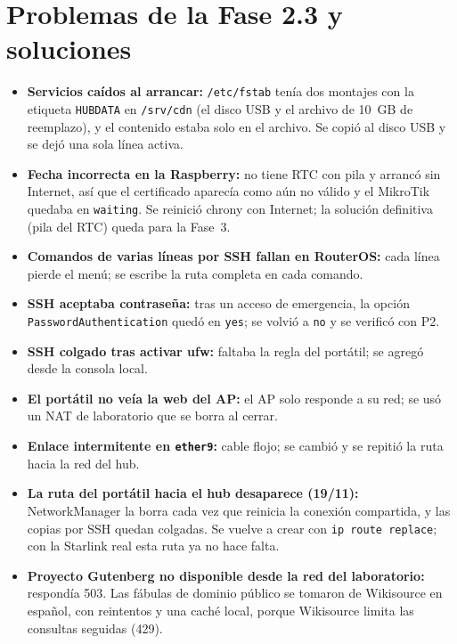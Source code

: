 \documentclass[conference]{IEEEtran}
\begin{document}
\section{Problemas de la Fase 2.3 y soluciones}
\begin{itemize}
\item \textbf{Servicios caídos al arrancar:} \texttt{/etc/fstab} tenía dos montajes con la etiqueta \texttt{HUBDATA} en \texttt{/srv/cdn} (el disco USB y el archivo de 10~GB de reemplazo), y el contenido estaba solo en el archivo. Se copió al disco USB y se dejó una sola línea activa.
\item \textbf{Fecha incorrecta en la Raspberry:} no tiene RTC con pila y arrancó sin Internet, así que el certificado aparecía como aún no válido y el MikroTik quedaba en \texttt{waiting}. Se reinició chrony con Internet; la solución definitiva (pila del RTC) queda para la Fase~3.
\item \textbf{Comandos de varias líneas por SSH fallan en RouterOS:} cada línea pierde el menú; se escribe la ruta completa en cada comando.
\item \textbf{SSH aceptaba contraseña:} tras un acceso de emergencia, la opción \texttt{PasswordAuthentication} quedó en \texttt{yes}; se volvió a \texttt{no} y se verificó con P2.
\item \textbf{SSH colgado tras activar ufw:} faltaba la regla del portátil; se agregó desde la consola local.
\item \textbf{El portátil no veía la web del AP:} el AP solo responde a su red; se usó un NAT de laboratorio que se borra al cerrar.
\item \textbf{Enlace intermitente en \texttt{ether9}:} cable flojo; se cambió y se repitió la ruta hacia la red del hub.
\item \textbf{La ruta del portátil hacia el hub desaparece (19/11):} NetworkManager la borra cada vez que reinicia la conexión compartida, y las copias por SSH quedan colgadas. Se vuelve a crear con \texttt{ip route replace}; con la Starlink real esta ruta ya no hace falta.
\item \textbf{Proyecto Gutenberg no disponible desde la red del laboratorio:} respondía 503. Las fábulas de dominio público se tomaron de Wikisource en español, con reintentos y una caché local, porque Wikisource limita las consultas seguidas (429).
\end{itemize}

\end{document}
